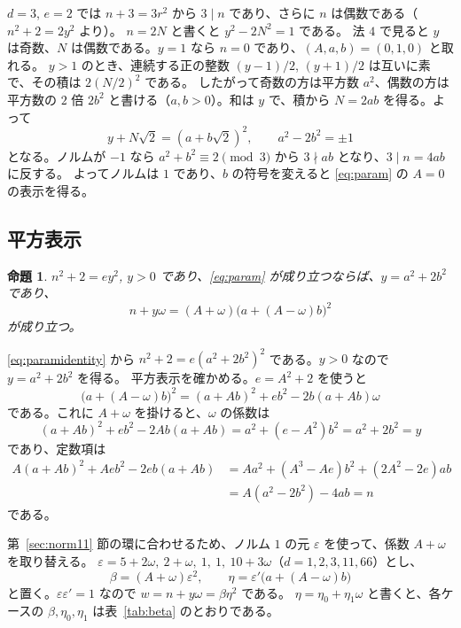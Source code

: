 \documentclass[a4paper,11pt]{ltjsarticle}
\makeatletter
\theoremstyle{jplain}
\newtheorem{proposition}[theorem]{命題}
\renewcommand{\proofname}{証明}
\renewenvironment{proof}[1][\proofname]{\par\pushQED{\qed}\normalfont\topsep6\p@\@plus6\p@\relax
  \trivlist\item[\hskip\labelsep\bfseries #1]\ignorespaces}{\popQED\endtrivlist\@endpefalse}
\numberwithin{equation}{section}
\numberwithin{table}{section}
\makeatother
\begin{document}
$d=3$, $e=2$ では $n+3=3r^2$ から $3\mid n$ であり、さらに $n$ は偶数である（$n^2+2=2y^2$ より）。
$n=2N$ と書くと $y^2-2N^2=1$ である。
法 $4$ で見ると $y$ は奇数、$N$ は偶数である。$y=1$ なら $n=0$ であり、$(A,a,b)=(0,1,0)$ と取れる。
$y>1$ のとき、連続する正の整数 $(y-1)/2$, $(y+1)/2$ は互いに素で、その積は $2(N/2)^2$ である。
したがって奇数の方は平方数 $a^2$、偶数の方は平方数の $2$ 倍 $2b^2$ と書ける（$a,b>0$）。和は $y$ で、積から $N=2ab$ を得る。よって
\[
y+N\sqrt2=(a+b\sqrt2)^2,\qquad a^2-2b^2=\pm1
\]
となる。ノルムが $-1$ なら $a^2+b^2\equiv2\pmod3$ から $3\nmid ab$ となり、$3\mid n=4ab$ に反する。
よってノルムは $1$ であり、$b$ の符号を変えると \eqref{eq:param} の $A=0$ の表示を得る。

\subsection{平方表示}

\begin{proposition}\label{prop:square}
$n^2+2=ey^2$, $y>0$ であり、\eqref{eq:param} が成り立つならば、$y=a^2+2b^2$ であり、
\[
n+y\omega=(A+\omega)\bigl(a+(A-\omega)b\bigr)^2
\]
が成り立つ。
\end{proposition}

\begin{proof}
\eqref{eq:paramidentity} から $n^2+2=e(a^2+2b^2)^2$ である。$y>0$ なので $y=a^2+2b^2$ を得る。
平方表示を確かめる。$e=A^2+2$ を使うと
\[
\bigl(a+(A-\omega)b\bigr)^2=(a+Ab)^2+eb^2-2b(a+Ab)\omega
\]
である。これに $A+\omega$ を掛けると、$\omega$ の係数は
\[
(a+Ab)^2+eb^2-2Ab(a+Ab)=a^2+(e-A^2)b^2=a^2+2b^2=y
\]
であり、定数項は
\[
\begin{aligned}
A(a+Ab)^2+Aeb^2-2eb(a+Ab)&=Aa^2+(A^3-Ae)b^2+(2A^2-2e)ab\\
&=A(a^2-2b^2)-4ab=n
\end{aligned}
\]
である。
\end{proof}

第~\ref{sec:norm11} 節の環に合わせるため、ノルム $1$ の元 $\varepsilon$ を使って、係数 $A+\omega$ を取り替える。
$\varepsilon=5+2\omega,\ 2+\omega,\ 1,\ 1,\ 10+3\omega$（$d=1,2,3,11,66$）とし、
\[
\beta=(A+\omega)\varepsilon^2,\qquad\eta=\varepsilon'\bigl(a+(A-\omega)b\bigr)
\]
と置く。$\varepsilon\varepsilon'=1$ なので $w=n+y\omega=\beta\eta^2$ である。
$\eta=\eta_0+\eta_1\omega$ と書くと、各ケースの $\beta,\eta_0,\eta_1$ は表~\ref{tab:beta} のとおりである。
\end{document}
